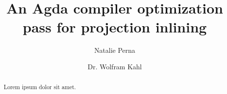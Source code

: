 \documentclass{llncs}
\title{An Agda compiler optimization pass for projection inlining}
\author{Natalie Perna\inst{1} \and Dr. Wolfram Kahl\inst{1}}
\institute{Department of Computing and Software, McMaster University}
\begin{document}
\maketitle

\begin{abstract}
Lorem ipsum dolor sit amet.
\end{abstract}
\end{document}
